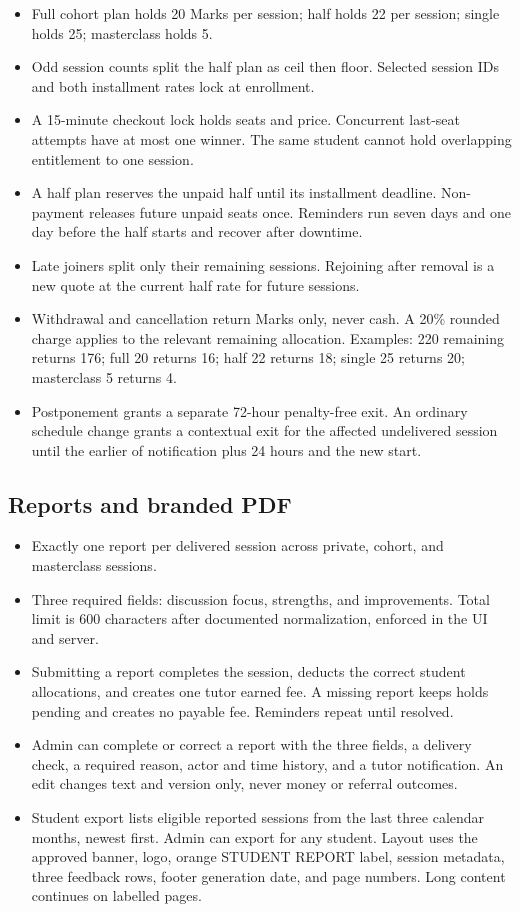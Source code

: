 \documentclass[11pt,a4paper]{article}
\begin{document}
\begin{itemize}
	\item Full cohort plan holds 20 Marks per session; half holds 22 per session; single holds 25; masterclass holds 5.
	\item Odd session counts split the half plan as ceil then floor. Selected session IDs and both installment rates lock at enrollment.
	\item A 15-minute checkout lock holds seats and price. Concurrent last-seat attempts have at most one winner. The same student cannot hold overlapping entitlement to one session.
	\item A half plan reserves the unpaid half until its installment deadline. Non-payment releases future unpaid seats once. Reminders run seven days and one day before the half starts and recover after downtime.
	\item Late joiners split only their remaining sessions. Rejoining after removal is a new quote at the current half rate for future sessions.
	\item Withdrawal and cancellation return Marks only, never cash. A 20\% rounded charge applies to the relevant remaining allocation. Examples: 220 remaining returns 176; full 20 returns 16; half 22 returns 18; single 25 returns 20; masterclass 5 returns 4.
	\item Postponement grants a separate 72-hour penalty-free exit. An ordinary schedule change grants a contextual exit for the affected undelivered session until the earlier of notification plus 24 hours and the new start.
\end{itemize}

\subsection{Reports and branded PDF}

\begin{itemize}
	\item Exactly one report per delivered session across private, cohort, and masterclass sessions.
	\item Three required fields: discussion focus, strengths, and improvements. Total limit is 600 characters after documented normalization, enforced in the UI and server.
	\item Submitting a report completes the session, deducts the correct student allocations, and creates one tutor earned fee. A missing report keeps holds pending and creates no payable fee. Reminders repeat until resolved.
	\item Admin can complete or correct a report with the three fields, a delivery check, a required reason, actor and time history, and a tutor notification. An edit changes text and version only, never money or referral outcomes.
	\item Student export lists eligible reported sessions from the last three calendar months, newest first. Admin can export for any student. Layout uses the approved banner, logo, orange STUDENT REPORT label, session metadata, three feedback rows, footer generation date, and page numbers. Long content continues on labelled pages.
\end{itemize}
\end{document}
